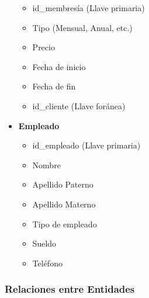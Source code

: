 \documentclass[spanish, 12pt]{article}
\providecommand{\tightlist}{\setlength{\itemsep}{0pt}
\setlength{\parskip}{0pt}}
\begin{document}
\begin{itemize}
			\begin{itemize}
				\tightlist

				\item id\_membresía (Llave primaria)

				\item Tipo (Mensual, Anual, etc.)

				\item Precio

				\item Fecha de inicio

				\item Fecha de fin

				\item id\_cliente (Llave foránea)
			\end{itemize}

		\item \textbf{Empleado}

			\begin{itemize}
				\tightlist

				\item id\_empleado (Llave primaria)

				\item Nombre

				\item Apellido Paterno

				\item Apellido Materno

				\item Tipo de empleado

				\item Sueldo

				\item Teléfono
			\end{itemize}
	\end{itemize}

	\subsubsection{Relaciones entre Entidades}
	\label{relaciones-entre-entidades}
\end{document}
